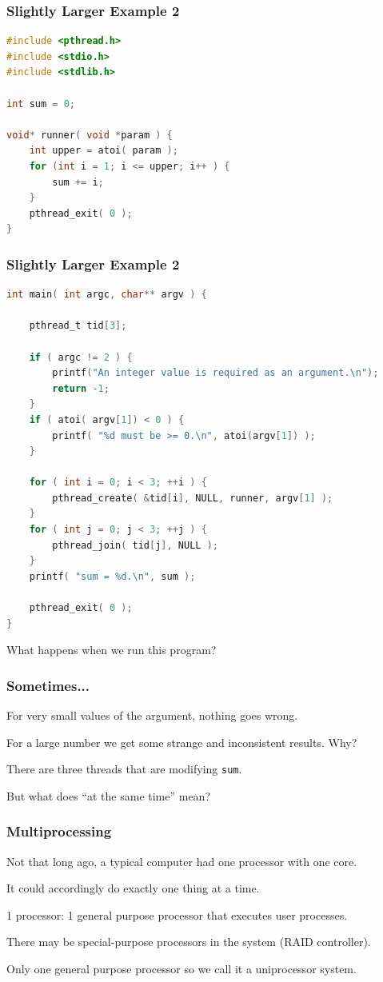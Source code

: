 \begin{frame}[fragile]
	\frametitle{Slightly Larger Example 2}

	\begin{lstlisting}[language=C]
#include <pthread.h>
#include <stdio.h>
#include <stdlib.h>

int sum = 0;

void* runner( void *param ) {
    int upper = atoi( param );
    for (int i = 1; i <= upper; i++ ) {
        sum += i;
    }
    pthread_exit( 0 );
}
\end{lstlisting}


\end{frame}

\begin{frame}[fragile]
	\frametitle{Slightly Larger Example 2}


	\begin{lstlisting}[language=C]
int main( int argc, char** argv ) { 

    pthread_t tid[3];

    if ( argc != 2 ) {
        printf("An integer value is required as an argument.\n");
        return -1; 
    }   
    if ( atoi( argv[1]) < 0 ) {
        printf( "%d must be >= 0.\n", atoi(argv[1]) );
    }   

    for ( int i = 0; i < 3; ++i ) { 
        pthread_create( &tid[i], NULL, runner, argv[1] );
    }   
    for ( int j = 0; j < 3; ++j ) { 
        pthread_join( tid[j], NULL );
    }   
    printf( "sum = %d.\n", sum );
    
    pthread_exit( 0 );
}
\end{lstlisting}

	What happens when we run this program?

\end{frame}


\begin{frame}
	\frametitle{Sometimes...}

	For very small values of the argument, nothing goes wrong.

	For a large number we get some strange and inconsistent results. Why?

	There are three threads that are modifying \texttt{sum}.

	But what does ``at the same time'' mean?

\end{frame}

\begin{frame}
	\frametitle{Multiprocessing}

	Not that long ago, a typical computer had one processor with one core.

	It could accordingly do exactly one thing at a time.

	1 processor: 1 general purpose processor that executes user processes.

	There may be special-purpose processors in the system (RAID controller).

	Only one general purpose processor so we call it a uniprocessor system.



\end{frame}


